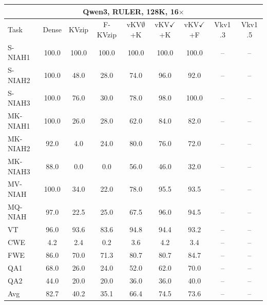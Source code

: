 \begin{tabular}{lcccccccc}
\toprule
\multicolumn{9}{c}{Qwen3, RULER, 128K, 16$\times$} \\
\midrule
Task & Dense & KVzip & F-KVzip & vKV$\emptyset$+K & vKV$\checkmark$+K & vKV$\checkmark$+F & Vkv1 .3 & Vkv1 .5 \\
\midrule
S-NIAH1 & 100.0 & 100.0 & 100.0 & 100.0 & 100.0 & 100.0 & -- & -- \\
S-NIAH2 & 100.0 & 48.0 & 28.0 & 74.0 & 96.0 & 92.0 & -- & -- \\
S-NIAH3 & 100.0 & 76.0 & 30.0 & 78.0 & 98.0 & 100.0 & -- & -- \\
MK-NIAH1 & 100.0 & 26.0 & 28.0 & 62.0 & 84.0 & 82.0 & -- & -- \\
MK-NIAH2 & 92.0 & 4.0 & 24.0 & 80.0 & 76.0 & 72.0 & -- & -- \\
MK-NIAH3 & 88.0 & 0.0 & 0.0 & 56.0 & 46.0 & 32.0 & -- & -- \\
MV-NIAH & 100.0 & 34.0 & 22.0 & 78.0 & 95.5 & 93.5 & -- & -- \\
MQ-NIAH & 97.0 & 22.5 & 25.0 & 67.5 & 96.0 & 94.5 & -- & -- \\
VT & 96.0 & 93.6 & 83.6 & 94.8 & 94.4 & 93.2 & -- & -- \\
CWE & 4.2 & 2.4 & 0.2 & 3.6 & 4.2 & 3.4 & -- & -- \\
FWE & 86.0 & 70.0 & 71.3 & 80.7 & 80.7 & 84.7 & -- & -- \\
QA1 & 68.0 & 26.0 & 24.0 & 52.0 & 62.0 & 70.0 & -- & -- \\
QA2 & 44.0 & 20.0 & 20.0 & 36.0 & 36.0 & 40.0 & -- & -- \\
\midrule
Avg & 82.7 & 40.2 & 35.1 & 66.4 & 74.5 & 73.6 & -- & -- \\
\bottomrule
\end{tabular}
\vspace{0.8em}


